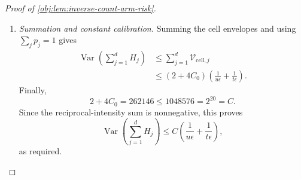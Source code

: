 \documentclass[11pt]{article}
\begin{document}
\begin{proof}[Proof of \cref{obj:lem:inverse-count-arm-risk}]
\begin{enumerate}
Using \(q_{aj}\le s_{aj}\) in the first two bounds yields
\[
\begin{aligned}
q_{aj}\frac{\rho_j^2+\rho_j}{(1+\lambda_j)^2}
&\le
\frac{s_{aj}\rho_j^2}{(1+\lambda_j)^2}
+\frac{s_{aj}\rho_j}{(1+\lambda_j)^2}\\
&\le\frac{s_{1-a,j}^2}{s_{aj}}+s_{1-a,j}
\le\frac{2p_j}\epsilon.
\end{aligned}
\]
Similarly, \(q_{aj}^2\le s_{aj}^2\) and the last two bounds give
\[
\begin{aligned}
q_{aj}^2\left(
\frac{\rho_j}{(1+\lambda_j)^2}
+\frac{\rho_j^2\lambda_j}{(1+\lambda_j)^4}
\right)
&\le
\frac{s_{aj}^2\rho_j}{(1+\lambda_j)^2}
+\frac{s_{aj}^2\rho_j^2\lambda_j}{(1+\lambda_j)^4}\\
&\le\frac{s_{1-a,j}}t
+\frac{s_{1-a,j}^2}{t s_{aj}}
\le\frac{2p_j}{t\epsilon}.
\end{aligned}
\]
Substitution into the cell envelope proves
\[
\begin{aligned}
\mathcal V_{\mathrm{cell},j}
&\le
\frac2u\frac{p_j}\epsilon
+\frac{2C_0}u\frac{2p_j}\epsilon
+C_0\frac{2p_j}{t\epsilon}\\
&=(2+4C_0)\frac{p_j}{u\epsilon}
+2C_0\frac{p_j}{t\epsilon}\\
&\le
(2+4C_0)p_j
\left(\frac1{u\epsilon}+\frac1{t\epsilon}\right).
\end{aligned}
\]
The last inequality adds the nonnegative quantity
\((2+2C_0)p_j/(t\epsilon)\). Together with the zero-mass case, this
establishes the envelope for every cell.

\item \emph{Summation and constant calibration.}
Summing the cell envelopes and using \(\sum_jp_j=1\) gives
\[
\begin{aligned}
\operatorname{Var}\!\left(\sum_{j=1}^{d}H_j\right)
&\le\sum_{j=1}^{d}\mathcal V_{\mathrm{cell},j}\\
&\le(2+4C_0)
\left(\frac1{u\epsilon}+\frac1{t\epsilon}\right).
\end{aligned}
\]
Finally,
\[
2+4C_0=262146\le1048576=2^{20}=C.
\]
Since the reciprocal-intensity sum is nonnegative, this proves
\[
\operatorname{Var}\!\left(\sum_{j=1}^{d}H_j\right)
\le C\left(\frac1{u\epsilon}+\frac1{t\epsilon}\right),
\]
as required.
\end{enumerate}
\end{proof}
\end{document}
